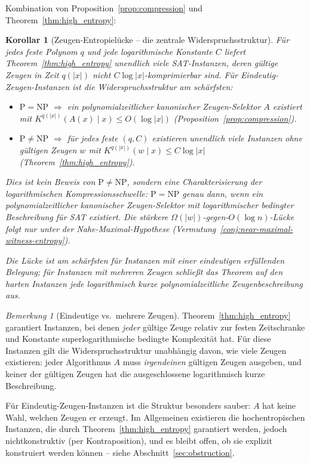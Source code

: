 \documentclass[aps,prd,twocolumn,superscriptaddress,nofootinbib]{revtex4-2}
\newtheorem{corollary}[theorem]{Korollar}
\theoremstyle{definition}
\theoremstyle{remark}
\newtheorem{remark}[theorem]{Bemerkung}
\newcommand{\NP}{\mathrm{NP}}
\newcommand{\PP}{\mathrm{P}}
\begin{document}
Kombination von Proposition~\ref{prop:compression} und Theorem~\ref{thm:high_entropy}:

\begin{corollary}[Zeugen-Entropielücke -- die zentrale Widerspruchsstruktur]
\label{cor:gap}
Für jedes feste Polynom $q$ und jede logarithmische Konstante $C$ liefert Theorem~\ref{thm:high_entropy} unendlich viele SAT-Instanzen, deren gültige Zeugen in Zeit $q(|x|)$ nicht $C\log |x|$-komprimierbar sind. Für Eindeutig-Zeugen-Instanzen ist die Widerspruchsstruktur am schärfsten:
\begin{itemize}
\item $\PP = \NP$ $\Rightarrow$ ein polynomialzeitlicher kanonischer Zeugen-Selektor $A$ existiert mit $K^{q(|x|)}(A(x) \mid x) \leq O(\log |x|)$ (Proposition~\ref{prop:compression}).
\item $\PP \neq \NP$ $\Rightarrow$ für jedes feste $(q,C)$ existieren unendlich viele Instanzen ohne gültigen Zeugen $w$ mit $K^{q(|x|)}(w \mid x) \leq C\log |x|$ (Theorem~\ref{thm:high_entropy}).
\end{itemize}
Dies ist kein Beweis von $\PP \neq \NP$, sondern eine Charakterisierung der logarithmischen Kompressionsschwelle: $\PP = \NP$ genau dann, wenn ein polynomialzeitlicher kanonischer Zeugen-Selektor mit logarithmischer bedingter Beschreibung für SAT existiert. Die stärkere $\Omega(|w|)$-gegen-$O(\log n)$-Lücke folgt nur unter der Nahe-Maximal-Hypothese (Vermutung~\ref{conj:near-maximal-witness-entropy}).

Die Lücke ist am schärfsten für Instanzen mit einer eindeutigen erfüllenden Belegung; für Instanzen mit mehreren Zeugen schließt das Theorem auf den harten Instanzen jede logarithmisch kurze polynomialzeitliche Zeugenbeschreibung aus.
\end{corollary}

\begin{remark}[Eindeutige vs.\ mehrere Zeugen]
Theorem~\ref{thm:high_entropy} garantiert Instanzen, bei denen \textit{jeder} gültige Zeuge relativ zur festen Zeitschranke und Konstante superlogarithmische bedingte Komplexität hat. Für diese Instanzen gilt die Widerspruchsstruktur unabhängig davon, wie viele Zeugen existieren: jeder Algorithmus $A$ muss \textit{irgendeinen} gültigen Zeugen ausgeben, und keiner der gültigen Zeugen hat die ausgeschlossene logarithmisch kurze Beschreibung.

Für Eindeutig-Zeugen-Instanzen ist die Struktur besonders sauber: $A$ hat keine Wahl, welchen Zeugen er erzeugt. Im Allgemeinen existieren die hochentropischen Instanzen, die durch Theorem~\ref{thm:high_entropy} garantiert werden, jedoch nichtkonstruktiv (per Kontraposition), und es bleibt offen, ob sie explizit konstruiert werden können -- siehe Abschnitt~\ref{sec:obstruction}.
\end{remark}
\end{document}
